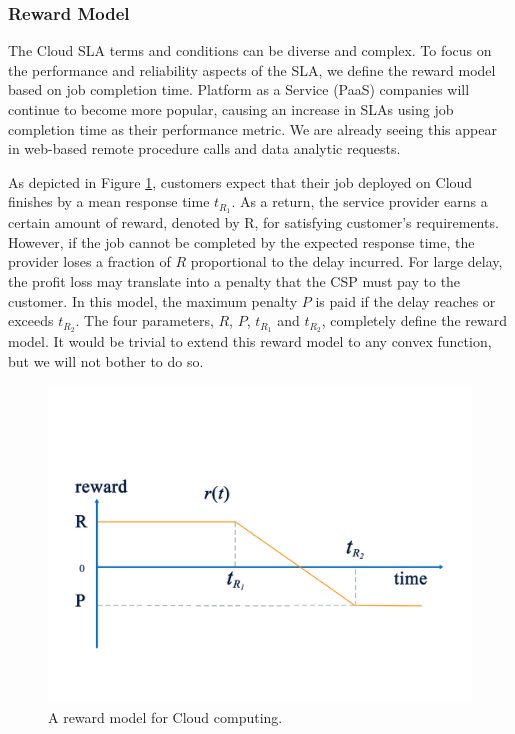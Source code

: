 \subsubsection{Reward Model}
\label{sec:sla_reward_model}

The Cloud SLA terms and conditions can be diverse and
complex. To focus on the performance and reliability
aspects of the SLA, we define the reward model based on job completion
time. Platform as a Service (PaaS) companies will continue to become
more popular, causing an increase in SLAs using job completion time as
their performance metric. We are already seeing this appear in
web-based remote procedure calls and data analytic requests.

As depicted in Figure \ref{fig:reward}, customers expect that their
job deployed on Cloud finishes by a mean response time $t_{R_1}$.  As a
return, the service provider earns a certain amount of reward, denoted by R,
for satisfying customer's requirements. However, if the job cannot be
completed by the expected response time, the provider loses a fraction of $R$
proportional to the delay incurred. For large delay, the profit loss may translate into a penalty that the CSP must pay to the customer. In this model, the maximum penalty $P$ is paid if the
delay reaches or exceeds $t_{R_2}$. The four
parameters, $R$, $P$, $t_{R_1}$ and
$t_{R_2}$, completely define the reward model. 
It would be trivial to extend this reward model to any convex function, but we will not bother to do so.

\begin{figure}[t]	
	\begin{center}
		\includegraphics[width=0.8\columnwidth]{Figures/reward.pdf}
	\end{center}
	\caption{A reward model for Cloud computing.}
	\label{fig:reward}
\end{figure}


